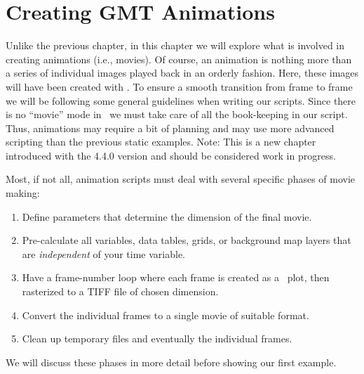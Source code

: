 %
%
\chapter{Creating GMT Animations}
\label{ch:8}
\thispagestyle{headings}

Unlike the previous chapter, in this chapter we will explore
what is involved in creating animations (i.e., movies).  Of course,
an animation is nothing more than a series of individual images
played back in an orderly fashion.  Here, these images will have
been created with \GMT.  To ensure a smooth transition from frame
to frame we will be following some general guidelines when writing
our scripts.  Since there is no ``movie'' mode in \GMT\ we must take
care of all the book-keeping in our script.  Thus, animations may
require a bit of planning and may use more advanced scripting than the
previous static examples.  Note: This is a new chapter introduced with the
4.4.0 version and should be considered work in progress.

Most, if not all, animation scripts must deal with several specific
phases of movie making:
\begin{enumerate}
	\item Define parameters that determine the dimension of the final movie.
	\item Pre-calculate all variables, data tables, grids, or background
	map layers that are \emph{independent} of your time variable.
	\item Have a frame-number loop where each frame is created as a \PS\ plot,
	then rasterized to a TIFF file of chosen dimension.
	\item Convert the individual frames to a single movie of suitable format.
	\item Clean up temporary files and eventually the individual frames.
\end{enumerate}

We will discuss these phases in more detail before showing our first example.

